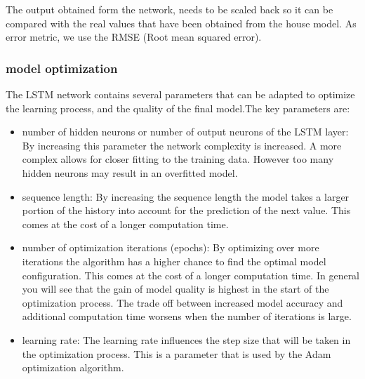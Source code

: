 The output obtained form the network, needs to be scaled back so it can be compared with the real values that have been obtained from the house model. As error metric, we use the RMSE (Root mean squared error). 

\subsubsection{model optimization}
The LSTM network contains several parameters that can be adapted to optimize the learning process, and the quality of the final model.The key parameters are:
\begin{itemize}
\item number of hidden neurons or number of output neurons of the LSTM layer: By increasing this parameter the network complexity is increased. A more complex allows for closer fitting to the training data. However too many hidden neurons may result in an overfitted model. 
\item sequence length: By increasing the sequence length the model takes a larger portion of the history into account for the prediction of the next value. This comes at the cost of a longer computation time. 
\item number of optimization iterations (epochs): By optimizing over more iterations the algorithm has a higher chance to find the optimal model configuration. This comes at the cost of a longer computation time. In general you will see that the gain of model quality is highest in the start of the optimization process. The trade off between increased model accuracy and additional computation time worsens when the number of iterations is large. 
\item learning rate: The learning rate influences the step size that will be taken in the optimization process. This is a parameter that is used by the Adam optimization algorithm. 
\end{itemize}


%
%





